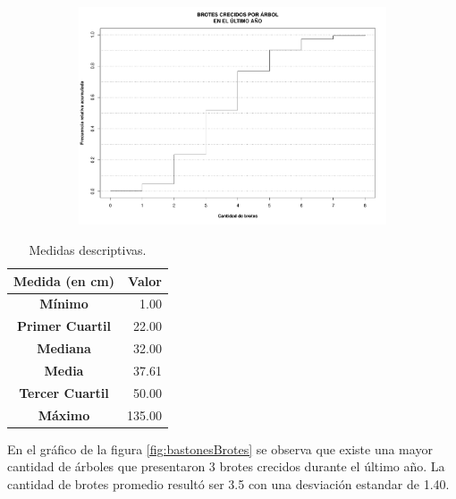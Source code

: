 \documentclass[11pt]{article}
\begin{document}
\newpage

\begin{figure}[h!]
  \ContinuedFloat
  \begin{center}
    \begin{subfigure}[b]{0.9\linewidth}
      \includegraphics[width=\linewidth]{acumBrotes.pdf}
      \caption{}
      \label{fig:acumBrotes}
    \end{subfigure}
    \caption{}
  \end{center}
\end{figure}

\begin{table}[h!]
  \begin{center}
    \begin{tabular}{| c | r |}
      \hline
      \textbf{Medida (en cm)} & \textbf{Valor} \\ \hline
      \textbf{Mínimo} & 1.00 \\ \hline
      \textbf{Primer Cuartil} & 22.00 \\ \hline
      \textbf{Mediana} & 32.00 \\ \hline
      \textbf{Media} & 37.61 \\ \hline
      \textbf{Tercer Cuartil} & 50.00 \\ \hline
      \textbf{Máximo} & 135.00 \\ \hline
    \end{tabular}
    \caption{Medidas descriptivas.}
    \label{tab:descripDiametro}
  \end{center}
\end{table}

\begin{justify}
  En el gráfico de la figura \ref{fig:bastonesBrotes} se observa que
  existe una mayor cantidad de árboles que presentaron 3 brotes crecidos
  durante el último año. La cantidad de brotes promedio resultó ser 3.5
  con una desviación estandar de 1.40.
\end{justify}
\end{document}
